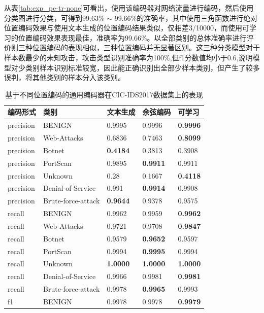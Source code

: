 从表\ref{tab:exp_pe-tr-none}可看出，使用该编码器对网络流量进行编码，然后使用分类图进行分类，可得到99.63\% $\sim$ 99.66\%的准确率，其中使用三角函数进行绝对位置编码效果与使用文本生成的位置编码结果类似，仅相差3/10000，而使用可学习的位置编码效果表现最佳，准确率为99.66\%。以全部类别的总体准确率进行评价则三种位置编码的表现相似，三种位置编码并无显著区别。这三种分类模型对于样本数最少的未知攻击，攻击类型识别准确率为100\%,但f1分数值均小于0.6,说明模型对少类别样本识别标准较宽，因此能正确识别出全部少样本类别，但产生了较多误判，将其他类别的样本分入该类别。

\begin{table}[htb]
    \centering
    \caption{基于不同位置编码的通用编码器在CIC-IDS2017数据集上的表现}
    \begin{adjustbox}{max width=.535\textwidth}
    \begin{tabular}{lllll}
    \toprule
        编码形式 & 类别& 文本生成 & 余弦编码  &可学习\\ \midrule
        precision & BENIGN & 0.9995 & 0.9996 & \textbf{0.9996} \\
        precision & Web-Attacks & 0.6836 & 0.7463 & \textbf{0.8099} \\
        precision & Botnet & \textbf{0.4184} & 0.3813 & 0.3908 \\
        precision & PortScan & 0.9895 & \textbf{0.9911} & 0.9911 \\
        precision & Unknown & 0.28 & 0.1667 & \textbf{0.4118} \\
        precision & Denial-of-Service & 0.991 & \textbf{0.9914} & 0.9908 \\
        precision & Brute-force-attack & \textbf{0.9644} & 0.9378 & 0.9575 \\
        recall & BENIGN & 0.9962 & 0.9959 & \textbf{0.9962} \\
        recall & Web-Attacks & 0.9721 & 0.9708 & \textbf{0.9847} \\
        recall & Botnet & 0.9579 & \textbf{0.9652} & 0.9597 \\
        recall & PortScan & 0.9994 & \textbf{0.9995} & 0.9994 \\
        recall & Unknown & \textbf{1.0000} & \textbf{1.0000} & \textbf{1.0000} \\
        recall & Denial-of-Service & 0.9966 & 0.9981 & \textbf{0.9981} \\
        recall & Brute-force-attack & 0.9978 & \textbf{0.9965} & 0.9993 \\
        f1 & BENIGN & 0.9978 & 0.9978 & \textbf{0.9979} \\

\end{tabular}
\end{adjustbox}
\end{table}
